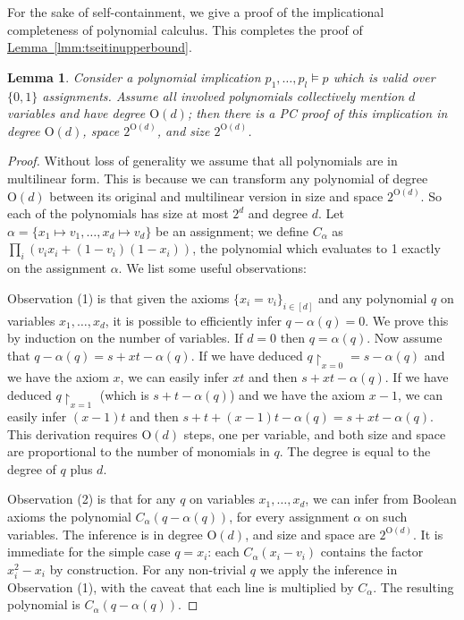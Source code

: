 \documentclass[11pt]{article}
\numberwithin{equation}{section}
\newtheorem{lemma}[theorem]{Lemma}
\theoremstyle{definition}
\theoremstyle{plain}
\newcommand{\expref}[2]{\hyperref[#2]{#1~\ref{#2}}}
\theoremstyle{plain}
\theoremstyle{definition}
\newcommand{\reflem}[1]{\expref{Lemma}{#1}}
\newcommand{\bigoh}[1]{\mathrm{O} ( #1 )}
\newcommand{\restrict}[2]{{{#1}\!\!\upharpoonright_{#2}}}
\begin{document}
For the sake of self-containment, we give a proof of the
implicational completeness of polynomial calculus. This completes the proof
%
of \reflem{lmm:tseitinupperbound}.    %

\begin{lemma}\label{lmm:pccompleteness}
  Consider a polynomial implication $p_{1}, \ldots, p_{l}\models p$ which is valid over $\{0,1\}$ assignments. Assume all involved polynomials collectively mention $d$ variables and have degree $\bigoh{d}$; then there is a PC proof of this implication in degree $\bigoh{d}$, space $2^{\bigoh{d}}$, and size $2^{\bigoh{d}}$.
\end{lemma}
\begin{proof} Without loss of generality we assume that all
  polynomials are in multilinear form. This is because we can
  transform any polynomial of degree $\bigoh{d}$ between its original
  and multilinear version in size and space $2^{\bigoh{d}}$. So each
  of the polynomials has size at most $2^{d}$ and degree $d$.
  Let $\alpha=\{x_{1}\mapsto v_{1}, \ldots, x_{d}\mapsto v_{d}\}$ be an assignment; we define $C_{\alpha}$ as $\prod_{i} (v_{i}x_{i} + (1-v_{i})(1-x_{i}))$, the polynomial which evaluates to 1 exactly on the assignment $\alpha$. We list some useful observations:

Observation (1) is that given the axioms $\{x_{i}=v_{i}\}_{i\in[d]}$
and any polynomial $q$ on variables $x_{1},\ldots,x_{d}$, it is
possible to efficiently infer $q-\alpha(q)=0$. We prove this by induction on the number of variables. If $d=0$ then $q=\alpha(q)$. Now assume that $q-\alpha(q)=s+xt-\alpha(q)$. If we have deduced $\restrict{q}{x=0}=s-\alpha(q)$ and we have the axiom $x$, we can easily infer $xt$ and then $s+xt-\alpha(q)$. If we have deduced $\restrict{q}{x=1}$ (which is $s+t-\alpha(q)$) and we have the axiom $x-1$, we can easily infer $(x-1)t$ and then $s+t+(x-1)t -\alpha(q) = s + xt -\alpha(q)$.
%
This derivation requires $\bigoh{d}$ steps, one per variable, and both
size and space are proportional to the number of monomials in $q$. The
degree is equal to the degree of $q$ plus $d$.

Observation (2) is that for any $q$ on variables $x_{1},\ldots,x_{d}$,
we can infer from Boolean axioms the polynomial
$C_{\alpha}(q-\alpha(q))$, for every assignment $\alpha$ on such
variables. The inference is in degree $\bigoh{d}$, and size and space are
$2^{\bigoh{d}}$. It is immediate for the simple case $q=x_{i}$: each
$C_{\alpha}(x_{i}-v_{i})$ contains the factor $x^{2}_{i}-x_{i}$ by
construction. For any non-trivial $q$ we apply the inference in
Observation (1), with the caveat that each line is multiplied by
$C_{\alpha}$. The resulting polynomial is $C_{\alpha}(q-\alpha(q))$.


\end{proof}
\end{document}
